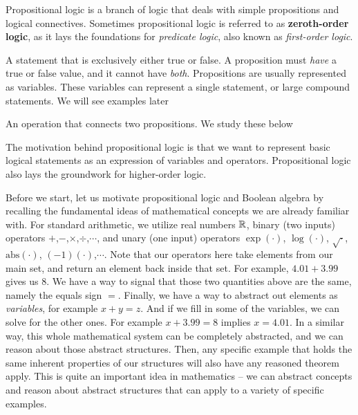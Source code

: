 \documentclass[main.tex]{subfiles}
\begin{document}
Propositional logic is a branch of logic that deals with simple propositions and logical connectives. Sometimes propositional logic is referred to as \textbf{zeroth-order logic}, as it lays the foundations for \textit{predicate logic}, also known as \textit{first-order logic}.

\begin{defn}[Proposition]
	A statement that is exclusively either true or false. A proposition must \textit{have} a true or false value, and it cannot have \textit{both}. Propositions are usually represented as variables. These variables can represent a single statement, or large compound statements. We will see examples later
\end{defn}

\begin{defn}
	An operation that connects two propositions. We study these below
\end{defn}

The motivation behind propositional logic is that we want to represent basic logical statements as an expression of variables and operators.
Propositional logic also lays the groundwork for higher-order logic.

Before we start, let us motivate propositional logic and Boolean algebra by recalling the fundamental ideas of mathematical concepts we are already familiar with.
For standard arithmetic, we utilize real numbers \(\mathbb{R}\), binary (two inputs) operators \(+\),\(-\),\(\times\),\(\div\),\(\cdots\), and unary (one input) operators \(\exp(\cdot)\), \(\log(\cdot)\), \(\sqrt{\cdot}\), \(\text{abs}(\cdot)\), \((-1)(\cdot)\),\(\cdots\).
Note that our operators here take elements from our main set, and return an element back inside that set.
For example, \(4.01 + 3.99\) gives us 8.
We have a way to signal that those two quantities above are the same, namely the equals sign \(=\).
Finally, we have a way to abstract out elements as \textit{variables}, for example \(x+y=z\).
And if we fill in some of the variables, we can solve for the other ones.
For example \(x+3.99=8\) implies \(x=4.01\).
In a similar way, this whole mathematical system can be completely abstracted, and we can reason about those abstract structures.
Then, any specific example that holds the same inherent properties of our structures will also have any reasoned theorem apply.
This is quite an important idea in mathematics -- we can abstract concepts and reason about abstract structures that can apply to a variety of specific examples.
\end{document}
